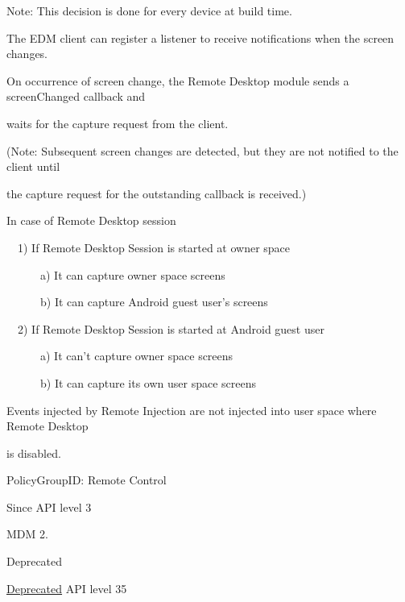 \-Note\-: \-This decision is done for every device at build time.\par


\-The \-E\-D\-M client can register a listener to receive notifications when the screen changes.

\-On occurrence of screen change, the \-Remote \-Desktop module sends a screen\-Changed callback and

waits for the capture request from the client.

(\-Note\-: \-Subsequent screen changes are detected, but they are not notified to the client until

the capture request for the outstanding callback is received.)\par


\par


\-In case of \-Remote \-Desktop session\par


~~1) \-If \-Remote \-Desktop \-Session is started at owner space\par


~~~~~~a) \-It can capture owner space screens\par


~~~~~~b) \-It can capture \-Android guest user's screens\par


~~2) \-If \-Remote \-Desktop \-Session is started at \-Android guest user\par


~~~~~~a) \-It can't capture owner space screens\par


~~~~~~b) \-It can capture its own user space screens\par


\-Events injected by \-Remote \-Injection are not injected into user space where \-Remote \-Desktop

is disabled.

\par


\begin{DoxyParagraph}{\-Policy\-Group\-I\-D\-: }
\-Remote \-Control
\end{DoxyParagraph}
\begin{DoxySince}{\-Since}
\-A\-P\-I level 3

\-M\-D\-M 2.
\end{DoxySince}
\begin{DoxyRefDesc}{\-Deprecated}
\item[\hyperlink{deprecated__deprecated000013}{\-Deprecated}]\-A\-P\-I level 35\end{DoxyRefDesc}


